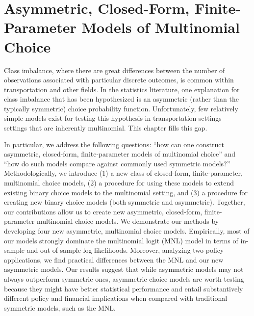 
\chapter{Asymmetric, Closed-Form, Finite-Parameter Models of Multinomial Choice}
\label{ch:3}

\begin{chapterabstract}
Class imbalance, where there are great differences between the number of observations associated with particular discrete outcomes, is common within transportation and other fields. In the statistics literature, one explanation for class imbalance that has been hypothesized is an asymmetric (rather than the typically symmetric) choice probability function. Unfortunately, few relatively simple models exist for testing this hypothesis in transportation settings---settings that are inherently multinomial. This chapter fills this gap.

In particular, we address the following questions: ``how can one construct asymmetric, closed-form, finite-parameter models of multinomial choice'' and ``how do such models compare against commonly used symmetric models?'' Methodologically, we introduce (1) a new class of closed-form, finite-parameter, multinomial choice models, (2) a procedure for using these models to extend existing binary choice models to the multinomial setting, and (3) a procedure for creating new binary choice models (both symmetric and asymmetric). Together, our contributions allow us to create new asymmetric, closed-form, finite-parameter multinomial choice models. We demonstrate our methods by developing four new asymmetric, multinomial choice models. Empirically, most of our models strongly dominate the multinomial logit (MNL) model in terms of in-sample and out-of-sample log-likelihoods. Moreover, analyzing two policy applications, we find practical differences between the MNL and our new asymmetric models. Our results suggest that while asymmetric models may not always outperform symmetric ones, asymmetric choice models are worth testing because they might have better statistical performance and entail substantively different policy and financial implications when compared with traditional symmetric models, such as the MNL.
\end{chapterabstract}

